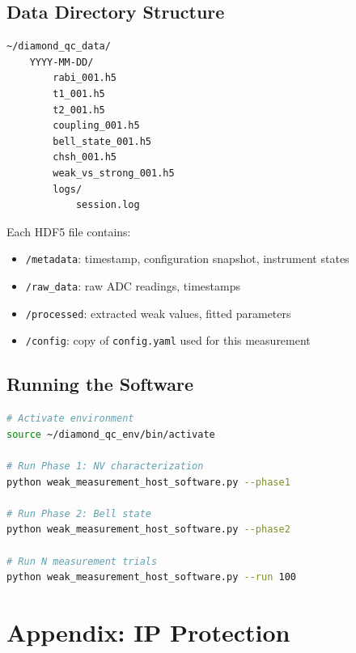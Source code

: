 \documentclass[11pt,a4paper,openany]{book}
\begin{document}
\section{Data Directory Structure}

\begin{lstlisting}[language={},numbers=none]
~/diamond_qc_data/
    YYYY-MM-DD/
        rabi_001.h5
        t1_001.h5
        t2_001.h5
        coupling_001.h5
        bell_state_001.h5
        chsh_001.h5
        weak_vs_strong_001.h5
        logs/
            session.log
\end{lstlisting}

\noindent
Each HDF5 file contains:
\begin{itemize}[nosep]
  \item \texttt{/metadata}: timestamp, configuration snapshot, instrument states
  \item \texttt{/raw\_data}: raw ADC readings, timestamps
  \item \texttt{/processed}: extracted weak values, fitted parameters
  \item \texttt{/config}: copy of \texttt{config.yaml} used for this measurement
\end{itemize}

\section{Running the Software}

\begin{lstlisting}[language=bash,numbers=none]
# Activate environment
source ~/diamond_qc_env/bin/activate

# Run Phase 1: NV characterization
python weak_measurement_host_software.py --phase1

# Run Phase 2: Bell state
python weak_measurement_host_software.py --phase2

# Run N measurement trials
python weak_measurement_host_software.py --run 100
\end{lstlisting}



\chapter*{Appendix: IP Protection}
\end{document}
